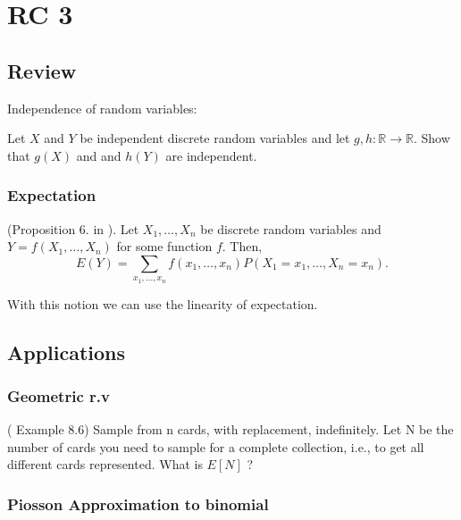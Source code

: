 \chapter{RC 3}

\section{Review}
Independence of random variables: 
\begin{exercise}
   Let \(X\) and \(Y\) be independent discrete random variables and let \(g, h:\mathbb{R} \to \mathbb{R}\). Show that \(g(X)\) and and \(h(Y)\) are independent. 
\end{exercise}

\subsection{Expectation}
\begin{theorem*}
   (Proposition 6. in \cite{Und_Chatterjee}). Let \(X_1,\dots , X_n\) be discrete random variables and 
   \(Y =f(X_1,\dots, X_n) \) for some function \(f\). Then,
   \[
    E(Y) = \sum_{x_1,\dots,x_n}f(x_1,\dots,x_n) P(X_1 = x_1, \dots, X_n = x_n).
   \] 
\end{theorem*}
With this notion we can use the linearity of expectation.

\section{Applications}
\subsection{Geometric r.v}
\begin{eg}
    (\cite{Gravner2021} Example 8.6)
Sample from n cards, with replacement,
    indefinitely. Let N be the number of cards you need to sample for a complete collection, i.e., to
    get all different cards represented. What is \(E[N]\) ?
\end{eg}
\subsection{Piosson Approximation to binomial}

